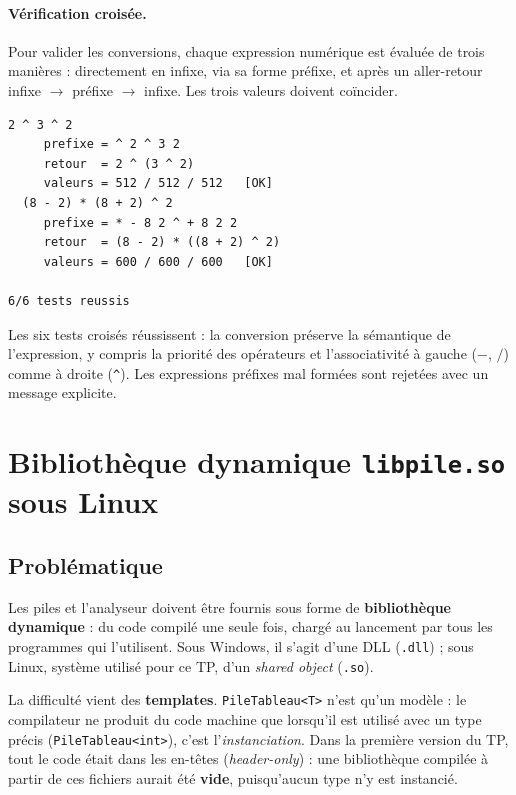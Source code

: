 \documentclass[11pt,a4paper]{article}
\newcommand{\code}[1]{\texttt{#1}}
\begin{document}
\paragraph{Vérification croisée.} Pour valider les conversions, chaque
expression numérique est évaluée de trois manières : directement en
infixe, via sa forme préfixe, et après un aller-retour
infixe $\to$ préfixe $\to$ infixe. Les trois valeurs doivent coïncider.

\begin{lstlisting}[style=sortie, caption={Extrait de la sortie de \code{test\_conversion}}]
  2 ^ 3 ^ 2
     prefixe = ^ 2 ^ 3 2
     retour  = 2 ^ (3 ^ 2)
     valeurs = 512 / 512 / 512   [OK]
  (8 - 2) * (8 + 2) ^ 2
     prefixe = * - 8 2 ^ + 8 2 2
     retour  = (8 - 2) * ((8 + 2) ^ 2)
     valeurs = 600 / 600 / 600   [OK]

6/6 tests reussis
\end{lstlisting}

Les six tests croisés réussissent : la conversion préserve la sémantique de
l'expression, y compris la priorité des opérateurs et l'associativité à
gauche ($-$, $/$) comme à droite (\code{\textasciicircum}). Les expressions préfixes mal
formées sont rejetées avec un message explicite.

\section{Bibliothèque dynamique \texorpdfstring{\code{libpile.so}}{libpile.so} sous Linux}
\label{sec:bibliotheque}

\subsection{Problématique}

Les piles et l'analyseur doivent être fournis sous forme de
\textbf{bibliothèque dynamique} : du code compilé une seule fois, chargé au
lancement par tous les programmes qui l'utilisent. Sous Windows, il s'agit
d'une DLL (\code{.dll}) ; sous Linux, système utilisé pour ce TP, d'un
\emph{shared object} (\code{.so}).

La difficulté vient des \textbf{templates}. \code{PileTableau<T>} n'est
qu'un modèle : le compilateur ne produit du code machine que lorsqu'il est
utilisé avec un type précis (\code{PileTableau<int>}), c'est
l'\emph{instanciation}. Dans la première version du TP, tout le code était
dans les en-têtes (\emph{header-only}) : une bibliothèque compilée à partir
de ces fichiers aurait été \textbf{vide}, puisqu'aucun type n'y est
instancié.
\end{document}
